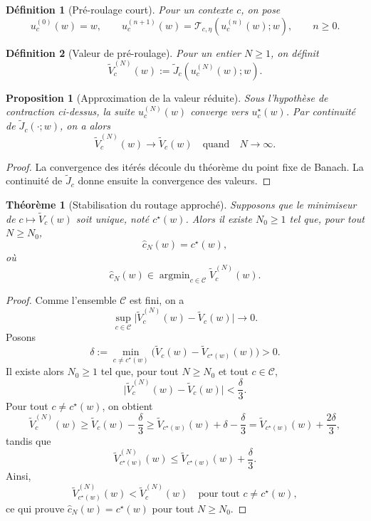 \documentclass[11pt,a4paper]{article}
\newtheorem{definition}{Définition}[section]
\newtheorem{proposition}{Proposition}[section]
\newtheorem{theorem}{Théorème}[section]
\DeclareMathOperator{\argmin}{argmin}
\newcommand{\Ccal}{\mathcal C}
\newcommand{\Tcal}{\mathcal T}
\begin{document}
\begin{definition}[Pré-roulage court]
Pour un contexte \(c\), on pose
\[
u_c^{(0)}(w)=w,
\qquad
u_c^{(n+1)}(w)=\Tcal_{c,\eta}(u_c^{(n)}(w);w),
\qquad n\ge 0.
\]
\end{definition}

\begin{definition}[Valeur de pré-roulage]
Pour un entier \(N\ge 1\), on définit
\[
\widetilde V_c^{(N)}(w):=\widetilde J_c(u_c^{(N)}(w);w).
\]
\end{definition}

\begin{proposition}[Approximation de la valeur réduite]
Sous l'hypothèse de contraction ci-dessus, la suite \(u_c^{(N)}(w)\) converge vers \(u_c^\star(w)\). Par continuité de \(\widetilde J_c(\cdot;w)\), on a alors
\[
\widetilde V_c^{(N)}(w)\longrightarrow \widetilde V_c(w)
\quad\text{quand}\quad N\to\infty.
\]
\end{proposition}

\begin{proof}
La convergence des itérés découle du théorème du point fixe de Banach. La continuité de \(\widetilde J_c\) donne ensuite la convergence des valeurs.
\end{proof}

\begin{theorem}[Stabilisation du routage approché]
Supposons que le minimiseur de \(c\mapsto \widetilde V_c(w)\) soit unique, noté \(c^\star(w)\). Alors il existe \(N_0\ge 1\) tel que, pour tout \(N\ge N_0\),
\[
\hat c_N(w)=c^\star(w),
\]
où
\[
\hat c_N(w)\in\argmin_{c\in\Ccal}\widetilde V_c^{(N)}(w).
\]
\end{theorem}

\begin{proof}
Comme l'ensemble \(\Ccal\) est fini, on a
\[
\sup_{c\in\Ccal}\bigl|\widetilde V_c^{(N)}(w)-\widetilde V_c(w)\bigr|\longrightarrow 0.
\]
Posons
\[
\delta:=\min_{c\neq c^\star(w)}\bigl(\widetilde V_c(w)-\widetilde V_{c^\star(w)}(w)\bigr)>0.
\]
Il existe alors \(N_0\ge 1\) tel que, pour tout \(N\ge N_0\) et tout \(c\in\Ccal\),
\[
\bigl|\widetilde V_c^{(N)}(w)-\widetilde V_c(w)\bigr|<\frac{\delta}{3}.
\]
Pour tout \(c\neq c^\star(w)\), on obtient
\[
\widetilde V_c^{(N)}(w)
\ge
\widetilde V_c(w)-\frac{\delta}{3}
\ge
\widetilde V_{c^\star(w)}(w)+\delta-\frac{\delta}{3}
=
\widetilde V_{c^\star(w)}(w)+\frac{2\delta}{3},
\]
tandis que
\[
\widetilde V_{c^\star(w)}^{(N)}(w)
\le
\widetilde V_{c^\star(w)}(w)+\frac{\delta}{3}.
\]
Ainsi,
\[
\widetilde V_{c^\star(w)}^{(N)}(w)<\widetilde V_c^{(N)}(w)
\quad\text{pour tout } c\neq c^\star(w),
\]
ce qui prouve \(\hat c_N(w)=c^\star(w)\) pour tout \(N\ge N_0\).
\end{proof}
\end{document}
